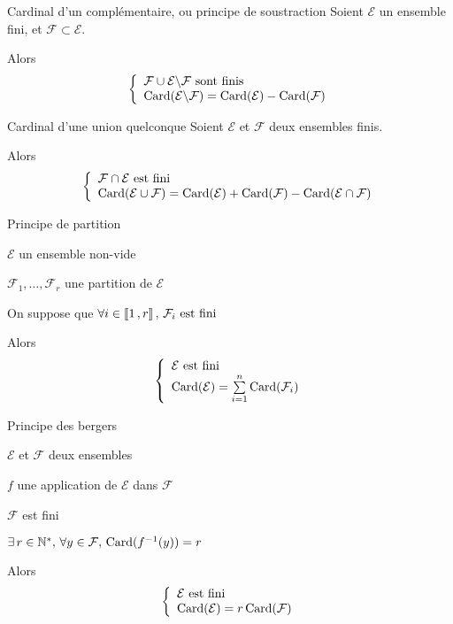     \begin{coro}{Cardinal d’un complémentaire, ou principe de soustraction}{}
        Soient $\mathcal{E}$ un ensemble fini, et $\mathcal{F} \subset \mathcal{E}$.
    
        Alors 
        \[ \et{\mathcal{F} \cup \mathcal{E} \backslash \mathcal{F} \text{ sont finis}}{\card(\mathcal{E} \backslash \mathcal{F}) = \card(\mathcal{E}) - \card(\mathcal{F})} \]
    \end{coro}

    \begin{coro}{Cardinal d’une union quelconque}{}
        Soient $\mathcal{E}$ et $\mathcal{F}$ deux ensembles finis. 
    
        Alors 
        \[ \et{\mathcal{F} \cap \mathcal{E} \text{ est fini}}{\card(\mathcal{E} \cup \mathcal{F}) = \card(\mathcal{E}) + \card(\mathcal{F}) - \card(\mathcal{E} \cap \mathcal{F})} \]
    \end{coro}

    \begin{coro}{Principe de partition}{}
        \begin{soient}
            \item $\mathcal{E}$ un ensemble non-vide
            \item $\mathcal{F}_1, \ldots, \mathcal{F}_r$ une partition de $\mathcal{E}$
        \end{soient}
        On suppose que $\forall i \in \left\llbracket 1 \, , r \right\rrbracket, \, \mathcal{F}_i \text{ est fini}$

        Alors \[ \et{\mathcal{E} \text{ est fini}}{\card(\mathcal{E}) = \sum\limits_{i=1}^n \card(\mathcal{F}_i)} \]
    \end{coro}

    \begin{prop}{Principe des bergers}{}
        \begin{soient}
            \item $\mathcal{E}$ et $\mathcal{F}$ deux ensembles
            \item $f$ une application de $\mathcal{E}$ dans $\mathcal{F}$
        \end{soient}
        \begin{suppose}
            \item $\mathcal{F}$ est fini
            \item $\exists \, r \in \mathbb{N}^*, \, \forall y \in \mathcal{F}, \, \operatorname{Card}(f^{-1}(y)) = r$
        \end{suppose}
        Alors 
        \[ \et{\mathcal{E} \text{ est fini}}{\card(\mathcal{E}) = r \card(\mathcal{F})} \]
    \end{prop}

